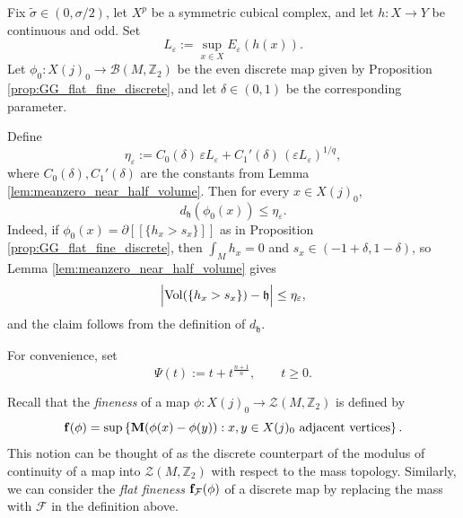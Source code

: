 \documentclass[12pt,english]{article}
\theoremstyle{definition}
\begin{document}
Fix $\tilde \sigma\in (0,\sigma/2)$, let $X^p$ be a symmetric cubical complex, and let $h:X\to Y$ be continuous and odd. Set
\[
L_\varepsilon:=\sup_{x\in X} E_\varepsilon(h(x)).
\]
Let $\phi_0:X(j)_0\to \mathcal B(M,\mathbb{Z}_2)$ be the even discrete map given by Proposition
\ref{prop:GG_flat_fine_discrete}, and let $\delta\in (0,1)$ be the corresponding parameter.

Define
\[
\eta_\varepsilon:= C_0(\delta)\,\varepsilon L_\varepsilon + C_1'(\delta)\,(\varepsilon L_\varepsilon)^{1/q},
\]
where $C_0(\delta),C_1'(\delta)$ are the constants from Lemma
\ref{lem:meanzero_near_half_volume}. Then for every $x\in X(j)_0$,
\begin{equation}\label{eq:GG_vertex_defect_bound}
d_{\mathfrak h}(\phi_0(x))\le \eta_\varepsilon.
\end{equation}
Indeed, if $\phi_0(x)=\partial[\![\{h_x>s_x\}]\!]$ as in Proposition
\ref{prop:GG_flat_fine_discrete}, then $\int_M h_x=0$ and
$s_x\in (-1+\delta,1-\delta)$, so Lemma \ref{lem:meanzero_near_half_volume} gives
\[
\Bigl|\operatorname{Vol}(\{h_x>s_x\})-\mathfrak h\Bigr|\le \eta_\varepsilon,
\]
and the claim follows from the definition of $d_{\mathfrak h}$.

For convenience, set
\[
\Psi(t):= t+t^{\frac{n+1}{n}}, \qquad t\ge 0.
\]

Recall that the \emph{fineness} of a map $\phi:X(j)_0 \to \mathcal Z(M,\mathbb{Z}_2)$ is defined by
	\[{\bf f}(\phi) = \sup\left\{ {\bf M}(\phi(x)-\phi(y)) : x,y \in X(j)_0 \ \mbox{adjacent vertices} \right\}.\]
This notion can be thought of as the discrete counterpart of the modulus of continuity of a map into $\mathcal Z(M,\mathbb{Z}_2)$ with respect to the mass topology. Similarly, we can consider the \textit{flat fineness} ${\bf f}_{\mathcal{F}}(\phi)$ of a discrete map by replacing the mass with $\mathcal{F}$ in the definition above.
\end{document}
